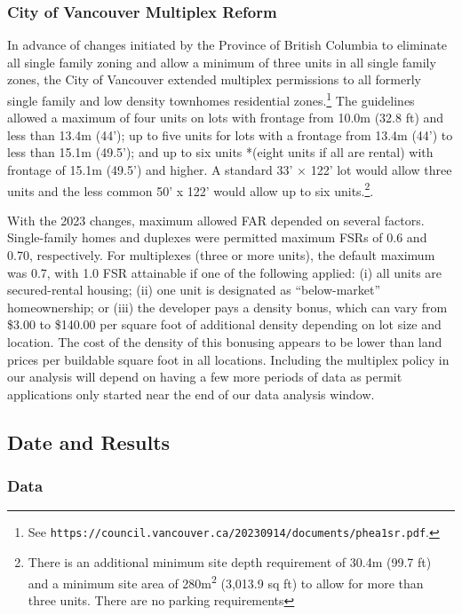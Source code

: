 \documentclass[12pt]{article}
\begin{document}
\subsubsection{City of Vancouver Multiplex Reform}

In advance of changes initiated by the Province of British Columbia to eliminate all single family zoning and allow a minimum of three units in all single family zones, the City of Vancouver extended multiplex permissions to all formerly single family and low density townhomes residential zones.\footnote{See \texttt{https://council.vancouver.ca/20230914/documents/phea1sr.pdf}.} The guidelines allowed a maximum of four units on lots with frontage from 10.0m (32.8 ft) and less than 13.4m (44'); up to five units for lots with a frontage from 13.4m (44') to less than 15.1m (49.5'); and up to six units *(eight units if all are rental) with frontage of 15.1m (49.5') and higher. A standard 33’ × 122’ lot would allow three units and the less common 50' x 122' would allow up to six units.\footnote{There is an additional minimum site depth requirement of 30.4m (99.7 ft) and a minimum site area of 280m\textsuperscript{2} (3,013.9 sq ft) to allow for more than three units. There are no parking requirements}. 

With the 2023 changes, maximum allowed FAR depended on several factors. Single-family homes and duplexes were permitted maximum FSRs of 0.6 and 0.70, respectively. For multiplexes (three or more units), the default maximum was 0.7, with 1.0 FSR attainable if one of the following applied: (i) all units are secured-rental housing; (ii) one unit is designated as ``below-market'' homeownership; or (iii) the developer pays a density bonus, which can vary from \$3.00 to \$140.00 per square foot of additional density depending on lot size and location. The cost of the density of this bonusing appears to be lower than land prices per buildable square foot in all locations. Including the multiplex policy in our analysis will depend on having a few more periods of data as permit applications only started near the end of our data analysis window.

\subsection{Date and Results}

\subsubsection{Data}
\end{document}
